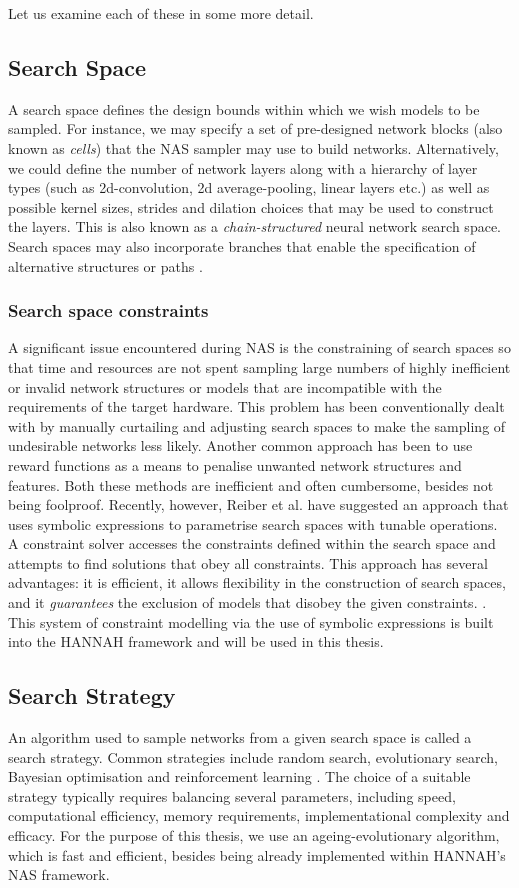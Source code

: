\documentclass[11pt,a4paper, open=any]{scrbook}
\newcounter{constraint}[chapter]
\newcounter{algorithm}[chapter]
\begin{document}
Let us examine each of these in some more detail.

\subsection{Search Space}
A search space defines the design bounds within which we wish models to be sampled. For instance, we may specify a set of pre-designed network blocks (also known as \textit{cells}) that the NAS sampler may use to build networks. Alternatively, we could define the number of network layers along with a hierarchy of layer types (such as 2d-convolution, 2d average-pooling, linear layers etc.) as well as possible kernel sizes, strides and dilation choices that may be used to construct the layers. This is also known as a \textit{chain-structured} neural network search space. Search spaces may also incorporate branches that enable the specification of alternative structures or paths \cite[2-5]{elsken19}.

\subsubsection{Search space constraints}
A significant issue encountered during NAS is the constraining of search spaces so that time and resources are not spent sampling large numbers of highly inefficient or invalid network structures or models that are incompatible with the requirements of the target hardware. This problem has been conventionally dealt with by manually curtailing and adjusting search spaces to make the sampling of undesirable networks less likely. Another common approach has been to use reward functions as a means to penalise unwanted network structures and features. Both these methods are inefficient and often cumbersome, besides not being foolproof. Recently, however, Reiber et al. have suggested an approach that uses symbolic expressions to parametrise search spaces with tunable operations. A constraint solver accesses the constraints defined within the search space and attempts to find solutions that obey all constraints. This approach has several advantages: it is efficient, it allows flexibility in the construction of search spaces, and it \textit{guarantees} the exclusion of models that disobey the given constraints. \cite{reiber26}. This system of constraint modelling via the use of symbolic expressions is built into the HANNAH framework and will be used in this thesis.

\subsection{Search Strategy}
An algorithm used to sample networks from a given search space is called a search strategy. Common strategies include random search, evolutionary search, Bayesian optimisation and reinforcement learning \cite[5-8]{elsken19}. The choice of a suitable strategy typically requires balancing several parameters, including speed, computational efficiency, memory requirements, implementational complexity and efficacy. For the purpose of this thesis, we use an ageing-evolutionary algorithm, which is fast and efficient, besides being already implemented within HANNAH's NAS framework.
\end{document}
